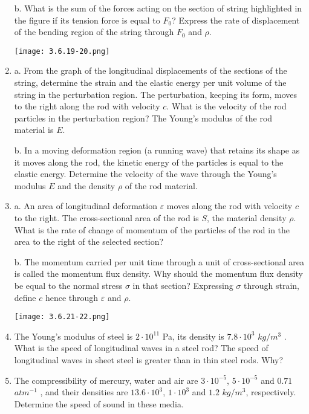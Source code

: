 \documentclass{article}
\begin{document}
\begin{enumerate}[label=3.6.\arabic*]
b. What is the sum of the forces acting on the section of string highlighted in the figure if its tension force is equal to $F_0$? Express the rate of displacement of the bending region of the string through $F_0$ and $\rho$.

\begin{center}
    \texttt{[image: 3.6.19-20.png]}
\end{center}

\item a. From the graph of the longitudinal displacements of the sections of the string, determine the strain and the elastic energy per unit volume of the string in the perturbation region. The perturbation, keeping its form, moves to the right along the rod with velocity $c$. What is the velocity of the rod particles in the perturbation region? The Young's modulus of the rod material is $E$. 

b. In a moving deformation region (a running wave) that retains its shape as it moves along the rod, the kinetic energy of the particles is equal to the elastic energy. Determine the velocity of the wave through the Young's modulus $E$ and the density $\rho$ of the rod material.

\item a. An area of longitudinal deformation $\varepsilon$ moves along the rod with velocity $c$ to the right. The cross-sectional area of the rod is $S$, the material density $\rho$. What is the rate of change of momentum of the particles of the rod in the area to the right of the selected section?

b. The momentum carried per unit time through a unit of cross-sectional area is called the momentum flux density. Why should the momentum flux density be equal to the normal stress $\sigma$ in that section? Expressing $\sigma$ through strain, define $c$ hence through $\varepsilon$ and $\rho$.

\begin{center}
    \texttt{[image: 3.6.21-22.png]}
\end{center}

\item The Young's modulus of steel is $2 \cdot 10^{11}$ Pa, its density is $7.8 \cdot 10^3$ $kg/m^3$ . What is the speed of longitudinal waves in a steel rod? The speed of longitudinal waves in sheet steel is greater than in thin steel rods. Why?

\item The compressibility of mercury, water and air are $3 \cdot 10^{-5}$, $5 \cdot 10^{-5}$ and $0.71$ $atm^{-1}$ , and their densities are $13.6 \cdot 10^3$, $1 \cdot 10^3$ and $1.2$ $kg/m^3$, respectively. Determine the speed of sound in these media.


\end{enumerate}
\end{document}
